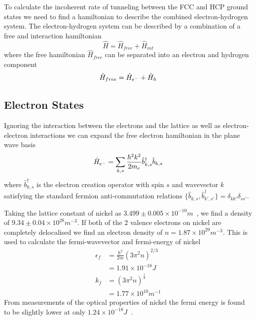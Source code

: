 To calculate the incoherent
rate of tunneling between
the FCC and HCP ground states
we need to find a
hamiltonian to describe the combined
electron-hydrogen system.
The electron-hydrogen system can be described
by a combination of a free and interaction hamiltonian
\begin{equation}
    \hat{H} = \hat{H}_{free} + \hat{H}_{int}
\end{equation}
where the free hamiltonian \(\hat{H}_{free}\)
can be separated
into an electron and hydrogen component
\begin{equation}
    \hat{H}_{free} =
    \hat{H}_{e^-} + \hat{H}_{h}\\
\end{equation}

\subsection{Electron States}\label{sec:electron states}
Ignoring the
interaction between the electrons
and the lattice as well as electron-electron
interactions we can expand the free electron
hamiltonian in the plane wave
basis
\begin{equation}
    \hat{H}_{e^-} = \sum_{k, s}
    \frac{\hbar^2 k^2}{2m_e} \hat{b}^\dagger_{k, s} \hat{b}_{k, s}\\
\end{equation}
where \(\hat{b}^\dagger_{k, s}\)
is the electron creation operator
with spin \(s\) and wavevector
\(k\) satisfying the standard
fermion anti-commutation relations
\( \{ \hat{b}_{k, s}, \hat{b}^\dagger_{k', s'} \}
= \delta_{k k'} \delta_{s s'}\).

Taking the lattice constant of nickel as
\(3.499\pm{}0.005\times{}10^{-10}m\)~\cite{PhysRev.25.753},
we find a density of
\(9.34 \pm 0.04 \times{}10^{28}m^{-3}\).
If both of the 2 valence
electrons on nickel are completely
delocalised we
find an electron density of
\(n = 1.87\times{}10^{29} m^{-3}\).
This is used to calculate
the fermi-wavevector and fermi-energy of
nickel~\cite{KittelCharles1953Itss}
\begin{align}
    \epsilon_f & = \frac{\hbar^2}{2m} {(3\pi^2n)}^{2/3}                   \\
               & = 1.91\times{}10^{-18}J                                  \\
    k_f        & = {(3 \pi^2 n)}^{\frac{1}{3}}                            \\
               & = 1.77\times{}10^{10}m^{-1} \label{eqn:fermi wavevector}
\end{align}
From measurements of the optical
properties of nickel the
fermi energy is found to
be slightly lower
at only
\(1.24\times{} 10^{-18}J\)~\cite{PhysRev.131.2469}.

